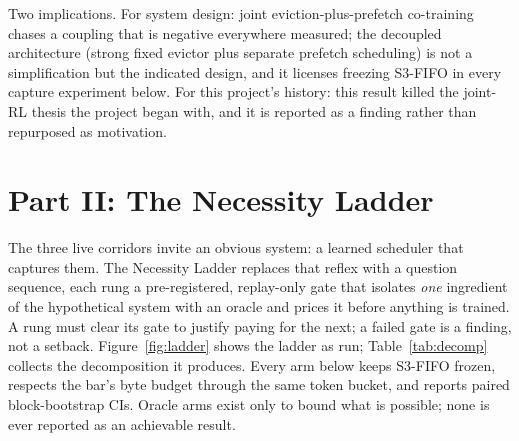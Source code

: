 \documentclass[11pt]{article}
\begin{document}
Two implications. For system design: joint eviction-plus-prefetch co-training chases a coupling that is negative everywhere measured; the decoupled architecture (strong fixed evictor plus separate prefetch scheduling) is not a simplification but the indicated design, and it licenses freezing S3-FIFO in every capture experiment below. For this project's history: this result killed the joint-RL thesis the project began with, and it is reported as a finding rather than repurposed as motivation.

\section{Part II: The Necessity Ladder}\label{sec:ladder}
The three live corridors invite an obvious system: a learned scheduler that captures them. The Necessity Ladder replaces that reflex with a question sequence, each rung a pre-registered, replay-only gate that isolates \emph{one} ingredient of the hypothetical system with an oracle and prices it before anything is trained. A rung must clear its gate to justify paying for the next; a failed gate is a finding, not a setback. Figure~\ref{fig:ladder} shows the ladder as run; Table~\ref{tab:decomp} collects the decomposition it produces. Every arm below keeps S3-FIFO frozen, respects the bar's byte budget through the same token bucket, and reports paired block-bootstrap CIs. Oracle arms exist only to bound what is possible; none is ever reported as an achievable result.
\end{document}

